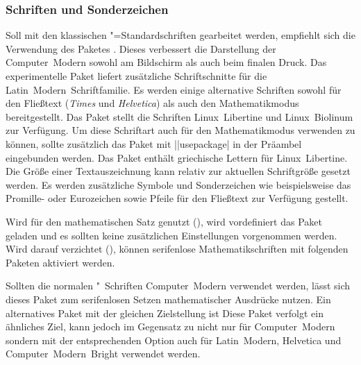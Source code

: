\subsubsection{Schriften und Sonderzeichen}
%
\begin{DeclarePackages}
  Soll mit den klassischen "=Standardschriften gearbeitet werden, 
  empfiehlt sich die Verwendung des Paketes . Dieses 
  verbessert die Darstellung der Computer~Modern sowohl am Bildschirm als auch 
  beim finalen Druck. Das experimentelle Paket  liefert 
  zusätzliche Schriftschnitte für die Latin~Modern~Schriftfamilie.
  Es werden einige alternative Schriften sowohl für den Fließtext 
  (\textit{Times} und \textit{Helvetica}) als auch den Mathematikmodus 
  bereitgestellt.
  Das Paket stellt die Schriften Linux~Libertine und Linux~Biolinum zur 
  Verfügung. Um diese Schriftart auch für den Mathematikmodus verwenden zu 
  können, sollte zusätzlich das Paket  mit 
  \Macro||{usepackage|} in der 
  Präambel eingebunden werden. Das Paket  enthält griechische 
  Lettern für Linux~Libertine.
  Die Größe einer Textauszeichnung kann relativ zur aktuellen Schriftgröße 
  gesetzt werden.
  Es werden zusätzliche Symbole und Sonderzeichen wie beispielsweise das 
  Promille- oder Eurozeichen sowie Pfeile für den Fließtext zur Verfügung 
  gestellt.
\end{DeclarePackages}
%
%
Wird für den mathematischen Satz \OpenSans genutzt (), wird 
vordefiniert das Paket  geladen und es sollten keine 
zusätzlichen Einstellungen vorgenommen werden. Wird darauf verzichtet 
(), können serifenlose Mathematikschriften mit folgenden 
Paketen aktiviert werden.
%
\begin{DeclarePackages}
  Sollten die normalen "~Schriften Computer~Modern verwendet 
  werden, lässt sich dieses Paket zum serifenlosen Setzen mathematischer 
  Ausdrücke nutzen. Ein alternatives Paket mit der gleichen Zielstellung ist 
  Diese Paket verfolgt ein ähnliches Ziel, kann jedoch im Gegensatz zu 
   nicht nur für Computer~Modern sondern mit der 
  entsprechenden Option auch für Latin~Modern, Helvetica und 
  Computer~Modern~Bright verwendet werden.
\end{DeclarePackages}



